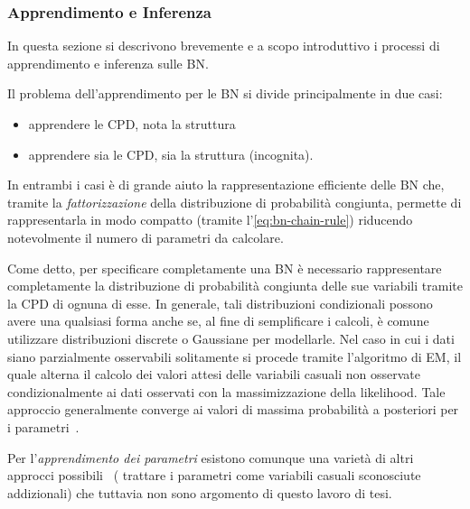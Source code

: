 \subsubsection{Apprendimento e Inferenza}\acresetall
In questa sezione si descrivono brevemente e a scopo introduttivo i processi di apprendimento e inferenza sulle \acl{BN}.

Il problema dell'apprendimento per le \acl{BN} si divide principalmente in due casi:
\begin{itemize}
    \item apprendere le \acs{CPD}, nota la struttura
    \item apprendere sia le \acs{CPD}, sia la struttura (incognita).
\end{itemize}
In entrambi i casi è di grande aiuto la rappresentazione efficiente delle \acl{BN} che, tramite la \emph{fattorizzazione} della distribuzione di probabilità congiunta, permette di rappresentarla in modo compatto (tramite l'\autoref{eq:bn-chain-rule}) riducendo notevolmente il numero di parametri da calcolare.

Come detto, per specificare completamente una \acl{BN} è necessario rappresentare completamente la distribuzione di probabilità congiunta delle sue variabili tramite la \acl{CPD} di ognuna di esse. In generale, tali distribuzioni condizionali possono avere una qualsiasi forma anche se, al fine di semplificare i calcoli, è comune utilizzare distribuzioni discrete o Gaussiane per modellarle. Nel caso in cui i dati siano parzialmente osservabili solitamente si procede tramite l'algoritmo di \acf{EM}, il quale alterna il calcolo dei valori attesi delle variabili casuali non osservate condizionalmente ai dati osservati con la massimizzazione della likelihood. Tale approccio generalmente converge ai valori di massima probabilità a posteriori per i parametri~\citep[si veda][]{Dempster1977}.

Per l'\emph{apprendimento dei parametri} esistono comunque una varietà di altri approcci possibili~\citep[si veda][]{Heckerman1996} (\eg{} trattare i parametri come variabili casuali sconosciute addizionali) che tuttavia non sono argomento di questo lavoro di tesi.

